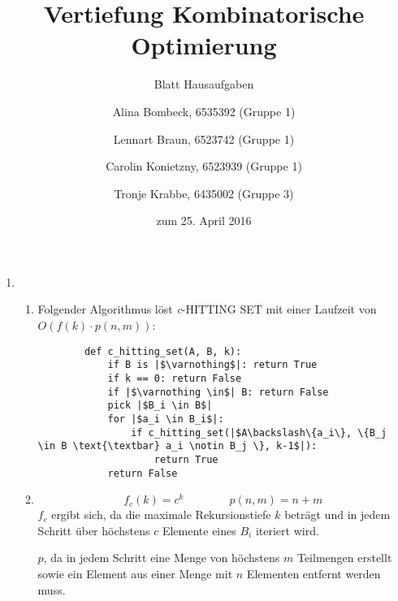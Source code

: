 \documentclass[a4paper]{scrartcl}
\title{Vertiefung Kombinatorische Optimierung}
\subtitle{Blatt {\blattnr} Hausaufgaben}
\author{%
    Alina Bombeck, 6535392 (Gruppe 1) \and
    Lennart Braun, 6523742 (Gruppe 1) \and
    Carolin Konietzny, 6523939 (Gruppe 1) \and
    Tronje Krabbe, 6435002 (Gruppe 3)
}
\date{zum 25. April 2016}
\begin{document}
\maketitle


\begin{enumerate}[label=\bfseries \arabic*.]
\item %
\begin{enumerate}
    \item %
        Folgender Algorithmus löst \textit{c}-HITTING SET mit einer Laufzeit von \\
        $O(f(k) \cdot p(n, m))$:
        \begin{verbatim}
        def c_hitting_set(A, B, k):
            if B is |$\varnothing$|: return True
            if k == 0: return False
            if |$\varnothing \in$| B: return False
            pick |$B_i \in B$|
            for |$a_i \in B_i$|:
                if c_hitting_set(|$A\backslash\{a_i\}, \{B_j \in B \text{\textbar} a_i \notin B_j \}, k-1$|):
                    return True
            return False
        \end{verbatim}

    \item %
        \begin{equation*}
            f_c(k) = c^k
            \qquad \qquad
            p(n,m) = n + m
        \end{equation*}
        $f_c$ ergibt sich, da die maximale Rekursionstiefe $k$ beträgt und in
        jedem Schritt über höchstens $c$ Elemente eines $B_i$ iteriert wird.

        $p$, da in jedem Schritt eine Menge von höchstens $m$ Teilmengen
        erstellt sowie ein Element aus einer Menge mit $n$ Elementen entfernt
        werden muss.


\end{enumerate}
\end{enumerate}
\end{document}
